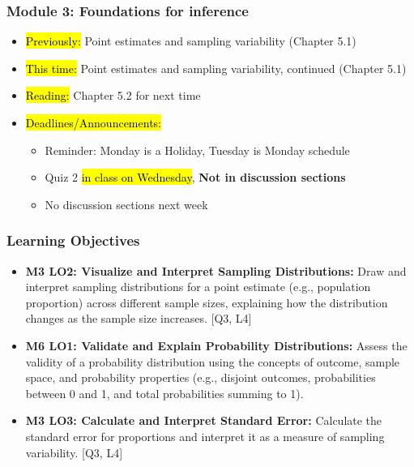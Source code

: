 
\begin{frame}
    \frametitle{Module 3: Foundations for inference}
    \begin{itemize}
        \item \hl{Previously: }Point estimates and sampling variability (Chapter 5.1)
        \item \hl{This time: }Point estimates and sampling variability, continued (Chapter 5.1)
        \item \hl{Reading: }Chapter 5.2 for next time
        \item \hl{Deadlines/Announcements: }
        \begin{itemize}
            \item Reminder: Monday is a Holiday, Tuesday is Monday schedule
            \item Quiz 2 \hl{in class on Wednesday}, \textbf{Not in discussion sections}
            \item No discussion sections next week
        \end{itemize}
    \end{itemize}
    
\end{frame}
    
\begin{frame}
\frametitle{Learning Objectives}
\begin{itemize}
    \item \textbf{M3 LO2: Visualize and Interpret Sampling Distributions:} Draw and interpret sampling distributions for a point estimate (e.g., population proportion) across different sample sizes, explaining how the distribution changes as the sample size increases. [Q3, L4]     \item \textbf{M6 LO1: Validate and Explain Probability Distributions:} Assess the validity of a probability distribution using the concepts of outcome, sample space, and probability properties (e.g., disjoint outcomes, probabilities between 0 and 1, and total probabilities summing to 1).
    \item \textbf{M3 LO3: Calculate and Interpret Standard Error:} Calculate the standard error for proportions and interpret it as a measure of sampling variability. [Q3, L4]
\end{itemize}
\end{frame}
